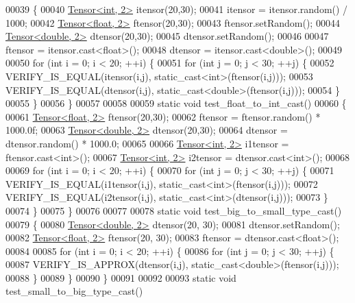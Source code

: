 \begin{DoxyCode}
00039 \{
00040   \hyperlink{class_eigen_1_1_tensor}{Tensor<int, 2>} itensor(20,30);
00041   itensor = itensor.random() / 1000;
00042   \hyperlink{class_eigen_1_1_tensor}{Tensor<float, 2>} ftensor(20,30);
00043   ftensor.setRandom();
00044   \hyperlink{class_eigen_1_1_tensor}{Tensor<double, 2>} dtensor(20,30);
00045   dtensor.setRandom();
00046 
00047   ftensor = itensor.cast<\textcolor{keywordtype}{float}>();
00048   dtensor = itensor.cast<\textcolor{keywordtype}{double}>();
00049 
00050   \textcolor{keywordflow}{for} (\textcolor{keywordtype}{int} i = 0; i < 20; ++i) \{
00051     \textcolor{keywordflow}{for} (\textcolor{keywordtype}{int} j = 0; j < 30; ++j) \{
00052       VERIFY\_IS\_EQUAL(itensor(i,j), static\_cast<int>(ftensor(i,j)));
00053       VERIFY\_IS\_EQUAL(dtensor(i,j), static\_cast<double>(ftensor(i,j)));
00054     \}
00055   \}
00056 \}
00057 
00058 
00059 \textcolor{keyword}{static} \textcolor{keywordtype}{void} test\_float\_to\_int\_cast()
00060 \{
00061   \hyperlink{class_eigen_1_1_tensor}{Tensor<float, 2>} ftensor(20,30);
00062   ftensor = ftensor.random() * 1000.0f;
00063   \hyperlink{class_eigen_1_1_tensor}{Tensor<double, 2>} dtensor(20,30);
00064   dtensor = dtensor.random() * 1000.0;
00065 
00066   \hyperlink{class_eigen_1_1_tensor}{Tensor<int, 2>} i1tensor = ftensor.cast<\textcolor{keywordtype}{int}>();
00067   \hyperlink{class_eigen_1_1_tensor}{Tensor<int, 2>} i2tensor = dtensor.cast<\textcolor{keywordtype}{int}>();
00068 
00069   \textcolor{keywordflow}{for} (\textcolor{keywordtype}{int} i = 0; i < 20; ++i) \{
00070     \textcolor{keywordflow}{for} (\textcolor{keywordtype}{int} j = 0; j < 30; ++j) \{
00071       VERIFY\_IS\_EQUAL(i1tensor(i,j), static\_cast<int>(ftensor(i,j)));
00072       VERIFY\_IS\_EQUAL(i2tensor(i,j), static\_cast<int>(dtensor(i,j)));
00073     \}
00074   \}
00075 \}
00076 
00077 
00078 \textcolor{keyword}{static} \textcolor{keywordtype}{void} test\_big\_to\_small\_type\_cast()
00079 \{
00080   \hyperlink{class_eigen_1_1_tensor}{Tensor<double, 2>} dtensor(20, 30);
00081   dtensor.setRandom();
00082   \hyperlink{class_eigen_1_1_tensor}{Tensor<float, 2>} ftensor(20, 30);
00083   ftensor = dtensor.cast<\textcolor{keywordtype}{float}>();
00084 
00085   \textcolor{keywordflow}{for} (\textcolor{keywordtype}{int} i = 0; i < 20; ++i) \{
00086     \textcolor{keywordflow}{for} (\textcolor{keywordtype}{int} j = 0; j < 30; ++j) \{
00087       VERIFY\_IS\_APPROX(dtensor(i,j), static\_cast<double>(ftensor(i,j)));
00088     \}
00089   \}
00090 \}
00091 
00092 
00093 \textcolor{keyword}{static} \textcolor{keywordtype}{void} test\_small\_to\_big\_type\_cast()

\end{DoxyCode}
